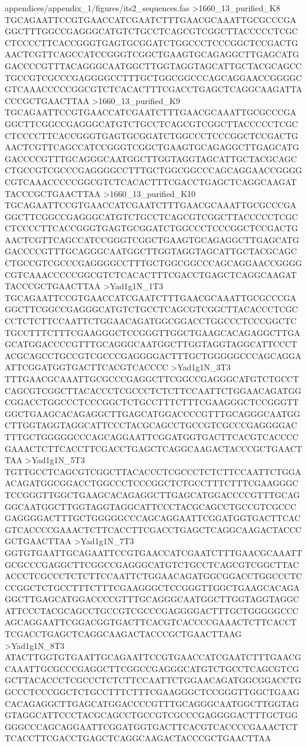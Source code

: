 {\begin{filecontents*}{appendices/appendix_1/figures/its2_sequences.fas}
>1660_13_purified_K8
TGCAGAATTCCGTGAACCATCGAATCTTTGAACGCAAATTGCGCCCGAGGCTTTGGCCGAGGGCATGTCTGCCTCAGCGTCGGCTTACCCCCTCGCCTCCCCTTCACCGGGTGAGTGCGGATCTGGCCCTCCCGGCTCCGACTGAACTCGTTCAGCCATCCGGGTCGGCTGAAGTGCAGAGGCTTGAGCATGGACCCCGTTTACAGGGCAATGGCTTGGTAGGTAGCATTGCTACGCAGCCTGCCGTCGCCCGAGGGGCCTTTGCTGGCGGCCCAGCAGGAACCGGGGCGTCAAACCCCCGGCGTCTCACACTTTCGACCTGAGCTCAGGCAAGATTACCCGCTGAACTTAA
>1660_13_purified_K9
TGCAGAATTCCGTGAACCATCGAATCTTTGAACGCAAATTGCGCCCGAGGCTTCGGCCGAGGGCATGTCTGCCTCAGCGTCGGCTTACCCCCTCGCCTCCCCTTCACCGGGTGAGTGCGGATCTGGCCCTCCCGGCTCCGACTGAACTCGTTCAGCCATCCGGGTCGGCTGAAGTGCAGAGGCTTGAGCATGGACCCCGTTTGCAGGGCAATGGCTTGGTAGGTAGCATTGCTACGCAGCCTGCCGTCGCCCGAGGGGCCTTTGCTGGCGGCCCAGCAGGAACCGGGGCGTCAAACCCCCGGCGTCTCACACTTTCGACCTGAGCTCAGGCAAGATTACCCGCTGAACTTAA
>1660_13_purified_K10
TGCAGAATTCCGTGAACCATCGAATCTTTGAACGCAAATTGCGCCCGAGGCTTCGGCCGAGGGCATGTCTGCCTCAGCGTCGGCTTACCCCCTCGCCTCCCCTTCACCGGGTGAGTGCGGATCTGGCCCTCCCGGCTCCGACTGAACTCGTTCAGCCATCCGGGTCGGCTGAAGTGCAGAGGCTTGAGCATGGACCCCGTTTGCAGGGCAATGGCTTGGTAGGTAGCATTGCTACGCAGCCTGCCGTCGCCCGAGGGGCCTTTGCTGGCGGCCCAGCAGGAACCGGGGCGTCAAACCCCCGGCGTCTCACACTTTCGACCTGAGCTCAGGCAAGATTACCCGCTGAACTTAA
>Yad1g1N_1T3
TGCAGAATTCCGTGAACCATCGAATCTTTGAACGCAAATTGCGCCCGAGGCTTCGGCCGAGGGCATGTCTGCCTCAGCGTCGGCTTACACCCTCGCCCTCTCTTCCAATTCTGGAACAGATGGCGGACCTGGCCCTCCCGGCTCTGCCTTTCTTTCGAAGGGCTCCGGGTTGGCTGAAGCACAGAGGCTTGAGCATGGACCCCGTTTGCAGGGCAATGGCTTGGTAGGTAGGCATTCCCTACGCAGCCTGCCGTCGCCCGAGGGGACTTTGCTGGGGGCCCAGCAGGAATTCGGATGGTGACTTCACGTCACCCC
>Yad1g1N_3T3
TTTGAACGCAAATTGCGCCCGAGGCTTCGGCCGAGGGCATGTCTGCCTCAGCGTCGGCTTACACCCTCGCCCTCTCTTCCAATTCTGGAACAGATGGCGGACCTGGCCCTCCCGGCTCTGCCTTTCTTTCGAAGGGCTCCGGGTTGGCTGAAGCACAGAGGCTTGAGCATGGACCCCGTTTGCAGGGCAATGGCTTGGTAGGTAGGCATTCCCTACGCAGCCTGCCGTCGCCCGAGGGGACTTTGCTGGGGGCCCAGCAGGAATTCGGATGGTGACTTCACGTCACCCCGAAACTCTTCACCTTCGACCTGAGCTCAGGCAAGACTACCCGCTGAACTTAA
>Yad1g1N_5T3
TGTTGCCTCAGCGTCGGCTTACACCCTCGCCCTCTCTTCCAATTCTGGAACAGATGGCGGACCTGGCCCTCCCGGCTCTGCCTTTCTTTCGAAGGGCTCCGGGTTGGCTGAAGCACAGAGGCTTGAGCATGGACCCCGTTTGCAGGGCAATGGCTTGGTAGGTAGGCATTCCCTACGCAGCCTGCCGTCGCCCGAGGGGACTTTGCTGGGGGCCCAGCAGGAATTCGGATGGTGACTTCACGTCACCCCGAAACTCTTCACCTTCGACCTGAGCTCAGGCAAGACTACCCGCTGAACTTAA
>Yad1g1N_7T3
GGTGTGAATTGCAGAATTCCGTGAACCATCGAATCTTTGAACGCAAATTGCGCCCGAGGCTTCGGCCGAGGGCATGTCTGCCTCAGCGTCGGCTTACACCCTCGCCCTCTCTTCCAATTCTGGAACAGATGGCGGACCTGGCCCTCCCGGCTCTGCCTTTCTTTCGAAGGGCTCCGGGTTGGCTGAAGCACAGAGGCTTGAGCATGGACCCCGTTTGCAGGGCAATGGCTTGGTAGGTAGGCATTCCCTACGCAGCCTGCCGTCGCCCGAGGGGACTTTGCTGGGGGCCCAGCAGGAATTCGGACGGTGACTTCACGTCACCCCGAAACTCTTCACCTTCGACCTGAGCTCAGGCAAGACTACCCGCTGAACTTAAG
>Yad1g1N_8T3
ATACTTGGTGTGAATTGCAGAATTCCGTGAACCATCGAATCTTTGAACGCAAATTGCGCCCGAGGCTTCGGCCGAGGGCATGTCTGCCTCAGCGTCGGCTTACACCCTCGCCCTCTCTTCCAATTCTGGAACAGATGGCGGACCTGGCCCTCCCGGCTCTGCCTTTCTTTCGAAGGGCTCCGGGTTGGCTGAAGCACAGAGGCTTGAGCATGGACCCCGTTTGCAGGGCAATGGCTTGGTAGGTAGGCATTCCCTACGCAGCCTGCCGTCGCCCGAGGGGACTTTGCTGGGGGCCCAGCAGGAATTCGGATGGTGACTTCACGTCACCCCGAAACTCTTCACCTTCGACCTGAGCTCAGGCAAGACTACCCGCTGAACTTAA
\end{filecontents*}}


